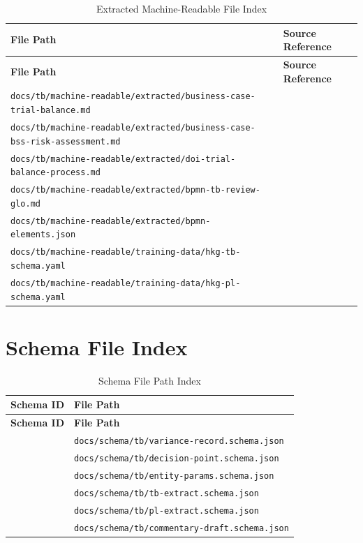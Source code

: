 \begin{longtable}{@{}L{7cm}L{6.5cm}@{}}
\caption{Extracted Machine-Readable File Index}
\label{tab:extracted-file-index} \\
\toprule
\textbf{File Path} & \textbf{Source Reference} \\
\midrule
\endfirsthead
\toprule
\textbf{File Path} & \textbf{Source Reference} \\
\midrule
\endhead
\texttt{docs/tb/machine-readable/extracted/business-case-trial-balance.md} &  \\
\texttt{docs/tb/machine-readable/extracted/business-case-bss-risk-assessment.md} &  \\
\texttt{docs/tb/machine-readable/extracted/doi-trial-balance-process.md} &  \\
\texttt{docs/tb/machine-readable/extracted/bpmn-tb-review-glo.md} &  \\
\texttt{docs/tb/machine-readable/extracted/bpmn-elements.json} &  \\
\texttt{docs/tb/machine-readable/training-data/hkg-tb-schema.yaml} &  \\
\texttt{docs/tb/machine-readable/training-data/hkg-pl-schema.yaml} &  \\
\bottomrule
\end{longtable}

\section{Schema File Index}
\label{sec:schema-file-index}

\begin{longtable}{@{}L{6.5cm}L{7cm}@{}}
\caption{Schema File Path Index}
\label{tab:schema-file-index} \\
\toprule
\textbf{Schema ID} & \textbf{File Path} \\
\midrule
\endfirsthead
\toprule
\textbf{Schema ID} & \textbf{File Path} \\
\midrule
\endhead
{} & \texttt{docs/schema/tb/variance-record.schema.json} \\
 & \texttt{docs/schema/tb/decision-point.schema.json} \\
 & \texttt{docs/schema/tb/entity-params.schema.json} \\
 & \texttt{docs/schema/tb/tb-extract.schema.json} \\
 & \texttt{docs/schema/tb/pl-extract.schema.json} \\
 & \texttt{docs/schema/tb/commentary-draft.schema.json} \\
\bottomrule
\end{longtable}

